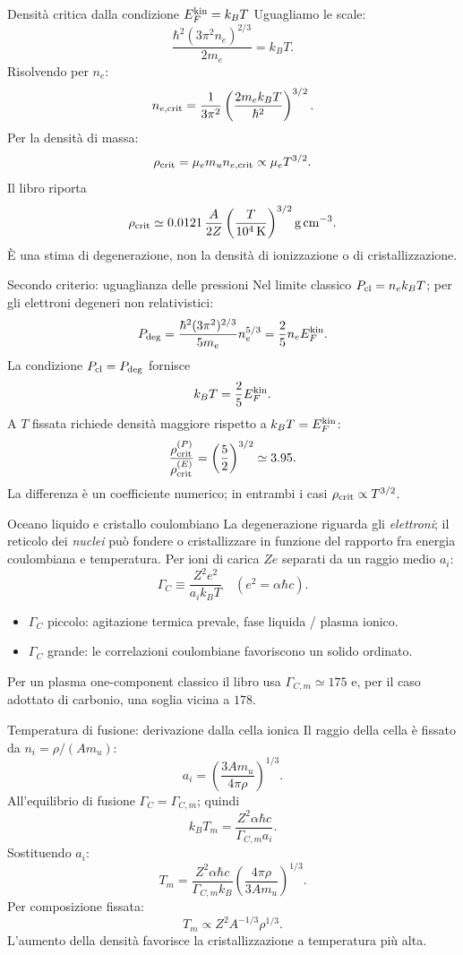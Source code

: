 \begin{frame}[t]{Densità critica dalla condizione $E_F^{\rm kin}=k_BT$}
\small
Uguagliamo le scale:
\[
\frac{\hbar^2(3\pi^2 n_e)^{2/3}}{2m_e}=k_BT.
\]
Risolvendo per $n_e$:
\[
n_{e,\rm crit}=\frac1{3\pi^2}
\left(\frac{2m_ek_BT}{\hbar^2}\right)^{3/2}.
\]
Per la densità di massa:
\[
\rho_{\rm crit}=\mu_em_u n_{e,\rm crit}
\propto\mu_eT^{3/2}.
\]
Il libro riporta
\[
\rho_{\rm crit}\simeq0.0121\,\frac{A}{2Z}
\left(\frac{T}{10^4\,{\rm K}}\right)^{3/2}
{\rm g\,cm^{-3}}.
\]
È una stima di degenerazione, non la densità di ionizzazione o di cristallizzazione.
\end{frame}

\begin{frame}[t]{Secondo criterio: uguaglianza delle pressioni}
\small
Nel limite classico $P_{\rm cl}=n_ek_BT$; per gli elettroni degeneri non relativistici:
\[
P_{\rm deg}=\frac{\hbar^2(3\pi^2)^{2/3}}{5m_e}n_e^{5/3}
=\frac25n_eE_F^{\rm kin}.
\]
La condizione $P_{\rm cl}=P_{\rm deg}$ fornisce
\[
k_BT=\frac25E_F^{\rm kin}.
\]
A $T$ fissata richiede densità maggiore rispetto a $k_BT=E_F^{\rm kin}$:
\[
\frac{\rho_{\rm crit}^{(P)}}{\rho_{\rm crit}^{(E)}}
=\left(\frac52\right)^{3/2}\simeq3.95.
\]
La differenza è un coefficiente numerico; in entrambi i casi $\rho_{\rm crit}\propto T^{3/2}$.
\end{frame}

\begin{frame}[t]{Oceano liquido e cristallo coulombiano}
\small
La degenerazione riguarda gli \emph{elettroni}; il reticolo dei \emph{nuclei} può fondere o cristallizzare in funzione del rapporto fra energia coulombiana e temperatura.
\medskip
Per ioni di carica $Ze$ separati da un raggio medio $a_i$:
\[
\Gamma_C\equiv\frac{Z^2e^2}{a_ik_BT}
\quad(e^2=\alpha\hbar c).
\]
\begin{itemize}
\item $\Gamma_C$ piccolo: agitazione termica prevale, fase liquida / plasma ionico.
\item $\Gamma_C$ grande: le correlazioni coulombiane favoriscono un solido ordinato.
\end{itemize}
Per un plasma one-component classico il libro usa $\Gamma_{C,m}\simeq175$ e, per il caso adottato di carbonio, una soglia vicina a $178$.
\end{frame}

\begin{frame}[t]{Temperatura di fusione: derivazione dalla cella ionica}
\small
Il raggio della cella è fissato da $n_i=\rho/(Am_u)$:
\[
a_i=\left(\frac{3Am_u}{4\pi\rho}\right)^{1/3}.
\]
All'equilibrio di fusione $\Gamma_C=\Gamma_{C,m}$; quindi
\[
k_BT_m=\frac{Z^2\alpha\hbar c}{\Gamma_{C,m}a_i}.
\]
Sostituendo $a_i$:
\[
T_m=\frac{Z^2\alpha\hbar c}{\Gamma_{C,m}k_B}
\left(\frac{4\pi\rho}{3Am_u}\right)^{1/3}.
\]
Per composizione fissata:
\[
T_m\propto Z^2A^{-1/3}\rho^{1/3}.
\]
L'aumento della densità favorisce la cristallizzazione a temperatura più alta.
\end{frame}

